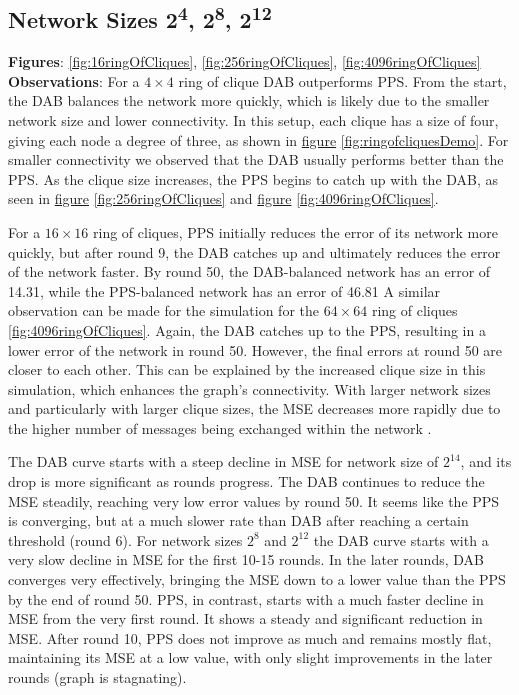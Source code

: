 \subsection{Network Sizes 2\textsuperscript{4}, 2\textsuperscript{8}, 2\textsuperscript{12}}
\textbf{Figures}: \ref{fig:16ringOfCliques}, \ref{fig:256ringOfCliques}, \ref{fig:4096ringOfCliques}\\
\textbf{Observations}: For a $4\times4$ ring of clique DAB outperforms PPS. From the start, the DAB balances the network more quickly, which is likely due to the smaller network size and lower connectivity. In this setup, each clique has a size of four, giving each node a degree of three, as shown in \hyperref[fig:ringofcliquesDemo]{figure} \ref{fig:ringofcliquesDemo}. For smaller connectivity we observed that the DAB usually performs better than the PPS. As the clique size increases, the PPS begins to catch up with the DAB, as seen in \hyperref[fig:256ringOfCliques]{figure} \ref{fig:256ringOfCliques} and \hyperref[fig:4096ringOfCliques]{figure} \ref{fig:4096ringOfCliques}.

For a $16\times16$ ring of cliques, PPS initially reduces the error of its network more quickly, but after round 9, the DAB catches up and ultimately reduces the error of the network faster. By round 50, the DAB-balanced network has an error of 14.31, while the PPS-balanced network has an error of 46.81 A similar observation can be made for the simulation for the $64 \times 64$ ring of cliques \ref{fig:4096ringOfCliques}. Again, the DAB catches up to the PPS, resulting in a lower error of the network in round 50. However, the final errors at round 50 are closer to each other. This can be explained by the increased clique size in this simulation, which enhances the graph's connectivity. With larger network sizes and particularly with larger clique sizes, the MSE decreases more rapidly due to the higher number of messages being exchanged within the network \cite{nugroho2023PushPullSumDataAg}.

The DAB curve starts with a steep decline in MSE for network size of $2^{14}$, and its drop is more significant as rounds progress. The DAB continues to reduce the MSE steadily, reaching very low error values by round 50. It seems like the PPS is converging, but at a much slower rate than DAB after reaching a certain threshold (round 6). For network sizes $2^{8}$ and $2^{12}$ the DAB curve starts with a very slow decline in MSE for the first 10-15 rounds. In the later rounds, DAB converges very effectively, bringing the MSE down to a lower value than the PPS by the end of round 50. PPS, in contrast, starts with a much faster decline in MSE from the very first round. It shows a steady and significant reduction in MSE. After round 10, PPS does not improve as much and remains mostly flat, maintaining its MSE at a low value, with only slight improvements in the later rounds (graph is stagnating).

